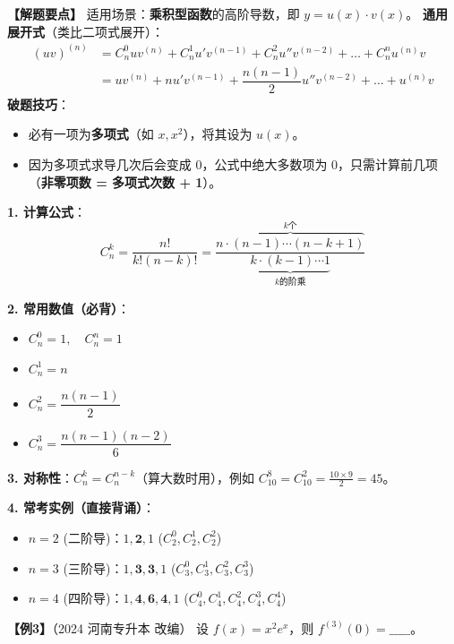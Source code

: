 \documentclass[12pt,a4paper]{article}
\begin{document}
\textbf{【解题要点】}
适用场景：\textbf{乘积型函数}的高阶导数，即 $y=u(x) \cdot v(x)$。
\textbf{通用展开式}（类比二项式展开）：
\begin{align*}
(uv)^{(n)} &= C_n^0 u v^{(n)} + C_n^1 u' v^{(n-1)} + C_n^2 u'' v^{(n-2)} + \dots + C_n^n u^{(n)} v \\
&= u v^{(n)} + n u' v^{(n-1)} + \dfrac{n(n-1)}{2} u'' v^{(n-2)} + \dots + u^{(n)} v
\end{align*}
\textbf{破题技巧}：
\begin{itemize}
    \item 必有一项为\textbf{多项式}（如 $x, x^2$），将其设为 $u(x)$。
    \item 因为多项式求导几次后会变成 0，公式中绝大多数项为 0，只需计算前几项（\textbf{非零项数 = 多项式次数 + 1}）。
\end{itemize}

\begin{tcolorbox}[colback=green!5!white, colframe=green!50!black, title=\textbf{★ 基础补给站：组合系数 $C_n^k$ 速算}]
\textbf{1. 计算公式}：
\[ C_n^k = \frac{n!}{k!(n-k)!} = \frac{\overbrace{n \cdot (n-1) \cdots (n-k+1)}^{k\text{个}}}{\underbrace{k \cdot (k-1) \cdots 1}_{k\text{的阶乘}}} \]

\textbf{2. 常用数值（必背）}：
\begin{itemize}
    \item $C_n^0 = 1, \quad C_n^n = 1$
    \item $C_n^1 = n$
    \item $C_n^2 = \dfrac{n(n-1)}{2}$
    \item $C_n^3 = \dfrac{n(n-1)(n-2)}{6}$
\end{itemize}

\textbf{3. 对称性}：$C_n^k = C_n^{n-k}$（算大数时用），例如 $C_{10}^8 = C_{10}^2 = \frac{10 \times 9}{2} = 45$。

\textbf{4. 常考实例（直接背诵）}：
\begin{itemize}
    \item $n=2$ (二阶导)：$1, \mathbf{2}, 1$ \quad ($C_2^0, C_2^1, C_2^2$)
    \item $n=3$ (三阶导)：$1, \mathbf{3}, \mathbf{3}, 1$ \quad ($C_3^0, C_3^1, C_3^2, C_3^3$)
    \item $n=4$ (四阶导)：$1, \mathbf{4}, \mathbf{6}, \mathbf{4}, 1$ \quad ($C_4^0, C_4^1, C_4^2, C_4^3, C_4^4$)
\end{itemize}
\end{tcolorbox}

\newpage
\textbf{【例3】}（2024 河南专升本 改编）
设 $f(x) = x^2 e^x$，则 $f^{(3)}(0) = \_\_\_\_\_$。
\vspace{16em}
\end{document}
